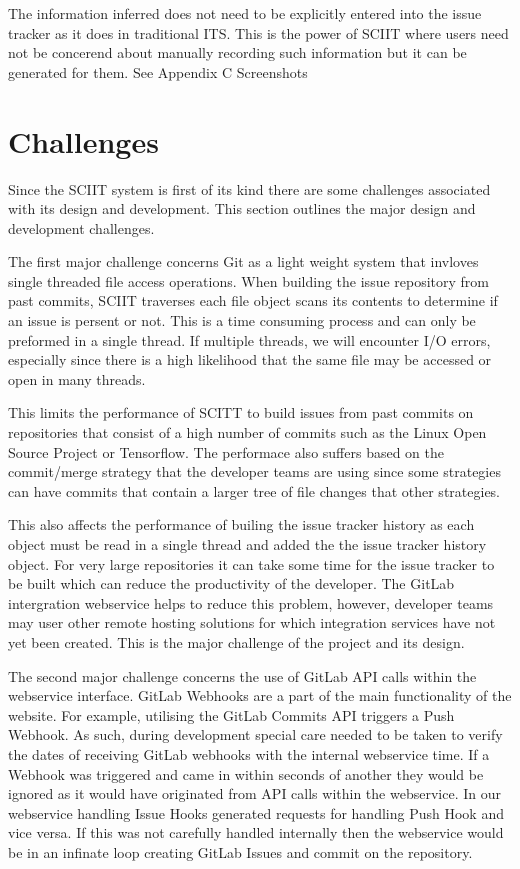 \documentclass{mproj}
\begin{document}
The information inferred does not need to be explicitly entered into the issue tracker as it does in traditional ITS. This is the power of SCIIT where users need not be concerend about manually recording such information but it can be generated for them. See Appendix C Screenshots %



\section{Challenges}

Since the SCIIT system is first of its kind there are some challenges associated with its design and development. This section outlines the major design and development challenges.

The first major challenge concerns Git as a light weight system that invloves single threaded file access operations. When building the issue repository from past commits, SCIIT traverses each file object scans its contents to determine if an issue is persent or not. This is a time consuming process and can only be preformed in a single thread. If multiple threads, we will encounter I/O errors, especially since there is a high likelihood that the same file may be accessed or open in many threads. 

This limits the performance of SCITT to build issues from past commits on repositories that consist of a high number of commits such as the Linux Open Source Project or Tensorflow. The performace also suffers based on the commit/merge strategy that the developer teams are using since some strategies can have commits that contain a larger tree of file changes that other strategies. 

This also affects the performance of builing the issue tracker history as each object must be read in a single thread and added the the issue tracker history object. For very large repositories it can take some time for the issue tracker to be built which can reduce the productivity of the developer. The GitLab intergration webservice helps to reduce this problem, however, developer teams may user other remote hosting solutions for which integration services have not yet been created. This is the major challenge of the project and its design.

The second major challenge concerns the use of GitLab API calls within the webservice interface. GitLab Webhooks are a part of the main functionality of the website. For example, utilising the GitLab Commits API triggers a Push Webhook. As such, during development special care needed to be taken to verify the dates of receiving GitLab webhooks with the internal webservice time. If a Webhook was triggered and came in within seconds of another they would be ignored as it would have originated from API calls within the webservice. In our webservice handling Issue Hooks generated requests for handling Push Hook and vice versa. If this was not carefully handled internally then the webservice would be in an infinate loop creating GitLab Issues and commit on the repository.
\end{document}
